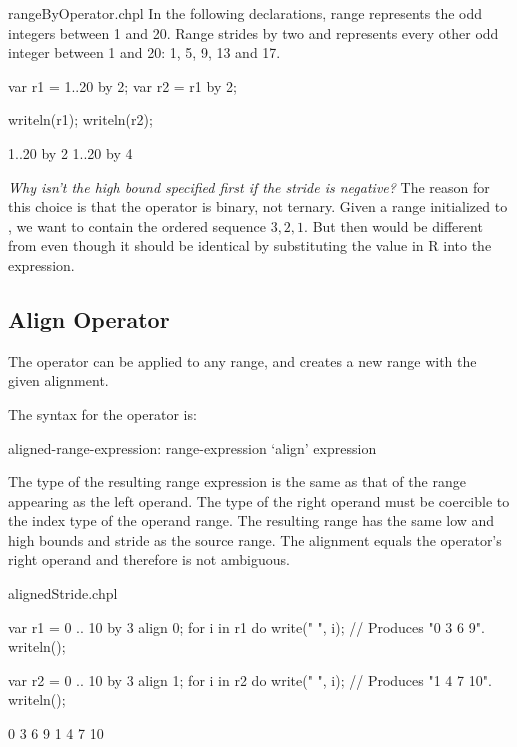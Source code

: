\begin{chapelexample}{rangeByOperator.chpl}
In the following declarations, range  represents the odd integers
between 1 and 20. Range  strides  by two and represents
every other odd integer between 1 and 20: 1, 5, 9, 13 and 17.
\begin{chapel}
var r1 = 1..20 by 2;
var r2 = r1 by 2;
\end{chapel}
\begin{chapelpost}
writeln(r1);
writeln(r2);
\end{chapelpost}
\begin{chapeloutput}
1..20 by 2
1..20 by 4
\end{chapeloutput}
\end{chapelexample}

\begin{rationale}
{\it Why isn't the high bound specified first if the stride is
negative?}  The reason for this choice is that the  operator
is binary, not ternary.  Given a range  initialized
to , we want  to contain the ordered sequence
$3,2,1$.  But then  would be different from  even though it should be identical by substituting the value in
R into the expression.
\end{rationale}


\subsection{Align Operator}
\label{Align_Operator}

The  operator can be applied to any range, and creates a new range
with the given alignment.  

The syntax for the  operator is:
\begin{syntax}
aligned-range-expression:
  range-expression `align' expression
\end{syntax}
\noindent The type of the resulting range expression is the same as that of the
range appearing as the left operand.  The type of the right operand must be
coercible to the index type of the operand range.  
The resulting range has the
same low and high bounds and stride as the source range. The
alignment equals the  operator's right operand
and therefore is not ambiguous. 

\begin{chapelexample}{alignedStride.chpl}
\begin{chapel}
var r1 = 0 .. 10 by 3 align 0;
for i in r1 do
  write(" ", i);			// Produces "0 3 6 9".
writeln();

var r2 = 0 .. 10 by 3 align 1;
for i in r2 do
  write(" ", i);			// Produces "1 4 7 10".
writeln();
\end{chapel}
\begin{chapeloutput}
 0 3 6 9
 1 4 7 10
\end{chapeloutput}
\end{chapelexample}

